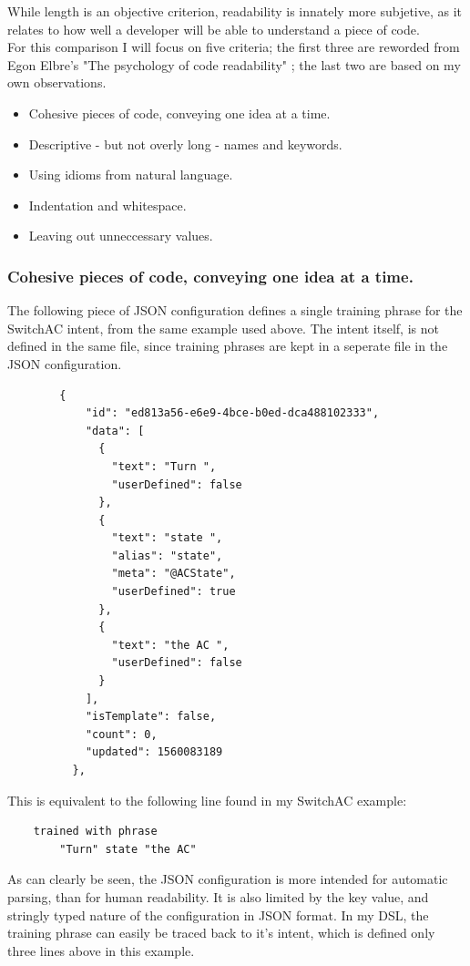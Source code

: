 While length is an objective criterion, readability is innately more subjetive, as it relates to how well a developer will be able to understand a piece of code.\\
For this comparison I will focus on five criteria; the first three are reworded from Egon Elbre's "The psychology of code readability" \cite{Elbre}; the last two are based on my own observations.
\begin{itemize}
    \item Cohesive pieces of code, conveying one idea at a time.
    \item Descriptive - but not overly long - names and keywords.
    \item Using idioms from natural language.
    \item Indentation and whitespace.
    \item Leaving out unneccessary values.
\end{itemize}

\subsubsection{Cohesive pieces of code, conveying one idea at a time.}

The following piece of JSON configuration defines a single training phrase for the SwitchAC intent, from the same example used above. The intent itself, is not defined in the same file, since training phrases are kept in a seperate file in the JSON configuration.
\begin{samepage}
    \begin{verbatim}
        {
            "id": "ed813a56-e6e9-4bce-b0ed-dca488102333",
            "data": [
              {
                "text": "Turn ",
                "userDefined": false
              },
              {
                "text": "state ",
                "alias": "state",
                "meta": "@ACState",
                "userDefined": true
              },
              {
                "text": "the AC ",
                "userDefined": false
              }
            ],
            "isTemplate": false,
            "count": 0,
            "updated": 1560083189
          },
    \end{verbatim}
\end{samepage}

This is equivalent to the following line found in my SwitchAC example:
\begin{verbatim}
    trained with phrase
        "Turn" state "the AC"
\end{verbatim}
As can clearly be seen, the JSON configuration is more intended for automatic parsing, than for human readability. It is also limited by the key value, and stringly typed nature of the configuration in JSON format. In my DSL, the training phrase can easily be traced back to it's intent, which is defined only three lines above in this example.

